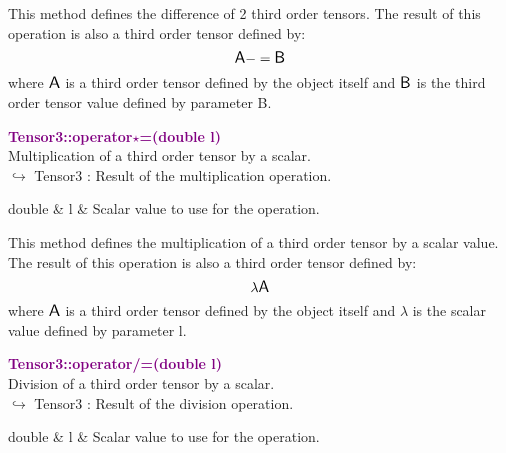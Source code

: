 This method defines the difference of 2 third order tensors.
The result of this operation is also a third order tensor defined by:
\begin{equation*}
\mbox{\large\ensuremath{\mathsf{A}}} -= \mbox{\large\ensuremath{\mathsf{B}}}
\end{equation*}
where $\mbox{\large\ensuremath{\mathsf{A}}}$ is a third order tensor defined by the object itself and $\mbox{\large\ensuremath{\mathsf{B}}}$ is the third order tensor value defined by parameter B.

\textcolor{purple}{\textbf{Tensor3::operator$\star$=(double l)}}\label{Tensor3::operator*=(double l)}\\
Multiplication of a third order tensor by a scalar.\\ \hspace*{10mm}$\hookrightarrow$ Tensor3 : Result of the multiplication operation.

\begin{tcolorbox}[width=\textwidth,myArgs,tabularx={ll|R}]
double & l & Scalar value to use for the operation.
\end{tcolorbox}

This method defines the multiplication of a third order tensor by a scalar value.
The result of this operation is also a third order tensor defined by:
\begin{equation*}
\lambda \mbox{\large\ensuremath{\mathsf{A}}}
\end{equation*}
where $\mbox{\large\ensuremath{\mathsf{A}}}$ is a third order tensor defined by the object itself and $\lambda$ is the scalar value defined by parameter l.

\textcolor{purple}{\textbf{Tensor3::operator/=(double l)}}\label{Tensor3::operator/=(double l)}\\
Division of a third order tensor by a scalar.\\ \hspace*{10mm}$\hookrightarrow$ Tensor3 : Result of the division operation.

\begin{tcolorbox}[width=\textwidth,myArgs,tabularx={ll|R}]
double & l & Scalar value to use for the operation.
\end{tcolorbox}

